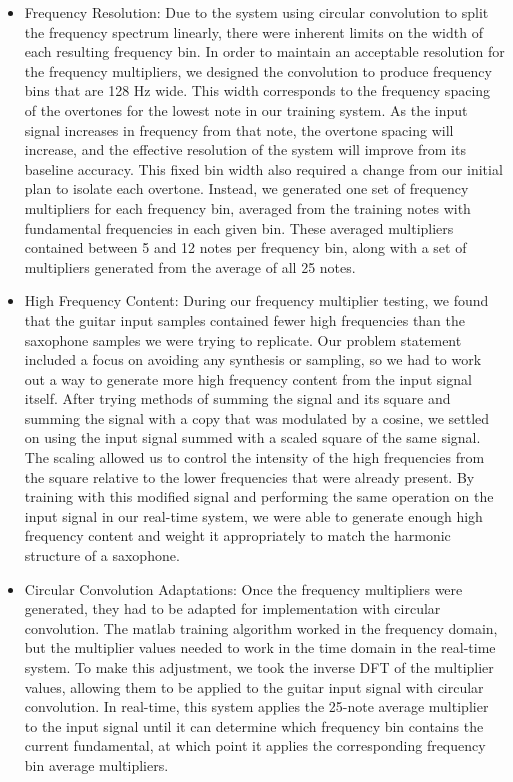 \documentclass[12pt]{article}
\begin{document}
\begin{itemize}
\item Frequency Resolution: Due to the system using circular convolution to split the frequency spectrum linearly, there were inherent limits on the width of each resulting frequency bin. In order to maintain an acceptable resolution for the frequency multipliers, we designed the convolution to produce frequency bins that are 128 Hz wide. This width corresponds to the frequency spacing of the overtones for the lowest note in our training system. As the input signal increases in frequency from that note, the overtone spacing will increase, and the effective resolution of the system will improve from its baseline accuracy. This fixed bin width also required a change from our initial plan to isolate each overtone. Instead, we generated one set of frequency multipliers for each frequency bin, averaged from the training notes with fundamental frequencies in each given bin. These averaged multipliers contained between 5 and 12 notes per frequency bin, along with a set of multipliers generated from the average of all 25 notes.

\item High Frequency Content: During our frequency multiplier testing, we found that the guitar input samples contained fewer high frequencies than the saxophone samples we were trying to replicate. Our problem statement included a focus on avoiding any synthesis or sampling, so we had to work out a way to generate more high frequency content from the input signal itself. After trying methods of summing the signal and its square and summing the signal with a copy that was modulated by a cosine, we settled on using the input signal summed with a scaled square of the same signal. The scaling allowed us to control the intensity of the high frequencies from the square relative to the lower frequencies that were already present. By training with this modified signal and performing the same operation on the input signal in our real-time system, we were able to generate enough high frequency content and weight it appropriately to match the harmonic structure of a saxophone.

\item Circular Convolution Adaptations: Once the frequency multipliers were generated, they had to be adapted for implementation with circular convolution. The matlab training algorithm worked in the frequency domain, but the multiplier values needed to work in the time domain in the real-time system. To make this adjustment, we took the inverse DFT of the multiplier values, allowing them to be applied to the guitar input signal with circular convolution. In real-time, this system applies the 25-note average multiplier to the input signal until it can determine which frequency bin contains the current fundamental, at which point it applies the corresponding frequency bin average multipliers.

\end{itemize}
\end{document}
